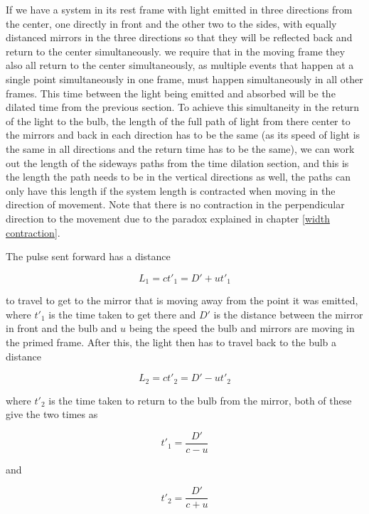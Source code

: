 If we have a system in its rest frame with light emitted in three directions from the center, one directly in front and the other two to the sides, with equally distanced mirrors in the three directions so that they will be reflected back and return to the center simultaneously. we require that in the moving frame they also all return to the center simultaneously, as multiple events that happen at a single point simultaneously in one frame, must happen simultaneously in all other frames. This time between the light being emitted and absorbed will be the dilated time from the previous section. To achieve this simultaneity in the return of the light to the bulb, the length of the full path of light from there center to the mirrors and back in each direction has to be the same (as its speed of light is the same in all directions and the return time has to be the same), we can work out the length of the sideways paths from the time dilation section, and this is the length the path needs to be in the vertical directions as well, the paths can only have this length if the system length is contracted when moving in the direction of movement. Note that there is no contraction in the perpendicular direction to the movement due to the paradox explained in chapter \ref{width contraction}.

The pulse sent forward has a distance

\begin{equation}
	L_1= ct'_1= D' + ut'_1
\end{equation}

to travel to get to the mirror that is moving away from the point it was emitted, where $t'_1$ is the time taken to get there and $D'$ is the distance between the mirror in front and the bulb and $u$ being the speed the bulb and mirrors are moving in the primed frame. After this, the light then has to travel back to the bulb a distance

\begin{equation}
	L_2 = ct'_2= D' - ut'_2
\end{equation}

where $t'_2$ is the time taken to return to the bulb from the mirror, both of these give the two times as

\begin{equation}
	t'_1=\frac{D'}{c-u}
\end{equation}

and

\begin{equation}
	t'_2=\frac{D'}{c+u}
\end{equation}

